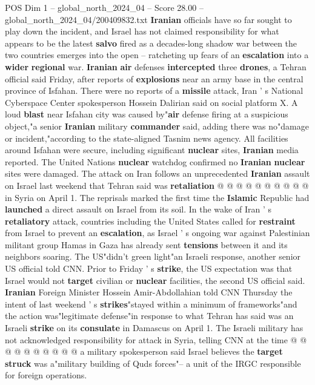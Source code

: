 \begin{textsample}{POS Dim 1 – global\_north\_2024\_04 – Score 28.00 – global\_north\_2024\_04/200409832.txt}  \label{ex:f1_pos_156}
\textbf{Iranian} officials have so far sought to play down the incident, and Israel has not claimed responsibility for what appears to be the latest \textbf{salvo} fired as a decades-long shadow war between the two countries emerges into the open -- ratcheting up fears of an \textbf{escalation} into a \textbf{wider} \textbf{regional} war. \textbf{Iranian} \textbf{air} defenses \textbf{intercepted} three \textbf{drones}, a Tehran official said Friday, after reports of \textbf{explosions} near an army base in the central province of Isfahan.
There were no reports of a \textbf{missile} attack, Iran ' s National Cyberspace Center spokesperson Hossein Dalirian said on social platform X.
A loud \textbf{blast} near Isfahan city was caused by"\textbf{air} defense firing at a suspicious object,"a senior \textbf{Iranian} military \textbf{commander} said, adding there was no"damage or incident,"according to the state-aligned Tasnim news agency.
All facilities around Isfahan were secure, including significant \textbf{nuclear} sites, \textbf{Iranian} media reported.
The United Nations \textbf{nuclear} watchdog confirmed no \textbf{Iranian} \textbf{nuclear} sites were damaged.
The attack on Iran follows an unprecedented \textbf{Iranian} assault on Israel last weekend that Tehran said was \textbf{retaliation} @ @ @ @ @ @ @ @ @ @ in Syria on April 1.
The reprisals marked the first time the \textbf{Islamic} Republic had \textbf{launched} a direct assault on Israel from its soil.
In the wake of Iran ' s \textbf{retaliatory} attack, countries including the United States called for \textbf{restraint} from Israel to prevent an \textbf{escalation}, as Israel ' s ongoing war against Palestinian militant group Hamas in Gaza has already sent \textbf{tensions} between it and its neighbors soaring.
The US"didn't green light"an Israeli response, another senior US official told CNN.
Prior to Friday ' s \textbf{strike}, the US expectation was that Israel would not \textbf{target} civilian or \textbf{nuclear} facilities, the second US official said. \textbf{Iranian} Foreign Minister Hossein Amir-Abdollahian told CNN Thursday the intent of last weekend ' s \textbf{strikes}"stayed within a minimum of frameworks"and the action was"legitimate defense"in response to what Tehran has said was an Israeli \textbf{strike} on its \textbf{consulate} in Damascus on April 1.
The Israeli military has not acknowledged responsibility for attack in Syria, telling CNN at the time @ @ @ @ @ @ @ @ @ @ a military spokesperson said Israel believes the \textbf{target} \textbf{struck} was a"military building of Quds forces"-- a unit of the IRGC responsible for foreign operations.

\end{textsample}
